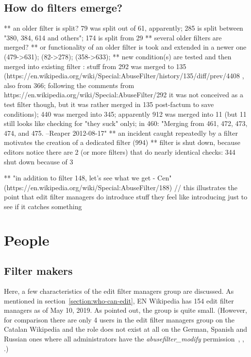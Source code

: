 \subsection{How do filters emerge?}
  ** an older filter is split? 79 was split out of 61, apparently; 285 is split between "380, 384, 614 and others"; 174 is split from 29
  ** several older filters are merged?
  ** or functionality of an older filter is took and extended in a newer one (479->631); (82->278); (358->633);
  ** new condition(s) are tested and then merged into existing filter : stuff from 292 was merged to 135 (https://en.wikipedia.org/wiki/Special:AbuseFilter/history/135/diff/prev/4408 , also from 366; following the comments from https://en.wikipedia.org/wiki/Special:AbuseFilter/292 it was not conceived as a test filter though, but it was rather merged in 135 post-factum to save conditions); 440 was merged into 345; apparently 912 was merged into 11 (but 11 still looks like checking for "they suck" only^^); in 460: "Merging from 461, 472, 473, 474, and 475. --Reaper 2012-08-17"
  ** an incident caught repeatedly by a filter motivates the creation of a dedicated filter (994)
  ** filter is shut down, because editors notice there are 2 (or more filters) that do nearly identical checks: 344 shut down because of 3

  ** "in addition to filter 148, let's see what we get - Cen" (https://en.wikipedia.org/wiki/Special:AbuseFilter/188) // this illustrates the point that edit filter managers do introduce stuff they feel like introducing just to see if it catches something

\section{People}
\subsection{Filter makers}

Here, a few characteristics of the edit filter managers group are discussed.
As mentioned in section~\ref{section:who-can-edit}, EN Wikipedia has 154 edit filter managers as of May 10, 2019.
As pointed out, the group is quite small.
(However, for comparison there are only 4 users in the edit filter managers group on the Catalan Wikipedia
and the role does not exist at all on the German, Spanish and Russian ones where all administrators have the \emph{abusefilter\_modify} permission~\cite{Wikipedia:EditFilterDE}, \cite{Wikipedia:EditFilterES}, \cite{Wikipedia:EditFilterRU}.)

